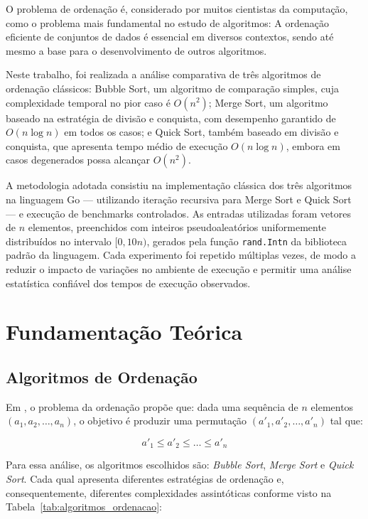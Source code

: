 \documentclass[12pt]{article}
\begin{document}
O problema de ordenação é, considerado por muitos cientistas da computação, como o problema mais fundamental no estudo de algoritmos: A ordenação eficiente de conjuntos de dados é essencial em diversos contextos, sendo até mesmo a base para o desenvolvimento de outros algoritmos.

Neste trabalho, foi realizada a análise comparativa de três algoritmos de ordenação clássicos: Bubble Sort, um algoritmo de comparação simples, cuja complexidade temporal no pior caso é $O(n^2)$; Merge Sort, um algoritmo baseado na estratégia de divisão e conquista, com desempenho garantido de $O(n \log n)$ em todos os casos; e Quick Sort, também baseado em divisão e conquista, que apresenta tempo médio de execução $O(n \log n)$, embora em casos degenerados possa alcançar $O(n^2)$.

A metodologia adotada consistiu na implementação clássica dos três algoritmos na linguagem Go \cite{golang} --- utilizando iteração recursiva para Merge Sort e Quick Sort --- e execução de benchmarks controlados. As entradas utilizadas foram vetores de $n$ elementos, preenchidos com inteiros pseudoaleatórios uniformemente distribuídos no intervalo $[0, 10n)$, gerados pela função \texttt{rand.Intn} da biblioteca padrão da linguagem. Cada experimento foi repetido múltiplas vezes, de modo a reduzir o impacto de variações no ambiente de execução e permitir uma análise estatística confiável dos tempos de execução observados.

\section{Fundamentação Teórica}

\subsection{Algoritmos de Ordenação}

Em \cite{cormen:2022}, o problema da ordenação propõe que: dada uma sequência de $n$ elementos $(a_1, a_2, \ldots, a_n)$, o objetivo é produzir uma permutação $(a'_1, a'_2, \ldots, a'_n)$ tal que:

\[
a'_1 \leq a'_2 \leq \ldots \leq a'_n
\]

Para essa análise, os algoritmos escolhidos são: \textit{Bubble Sort}, \textit{Merge Sort} e \textit{Quick Sort}. Cada qual apresenta diferentes estratégias de ordenação e, consequentemente, diferentes complexidades assintóticas conforme visto na Tabela~\ref{tab:algoritmos_ordenacao}:
\end{document}

